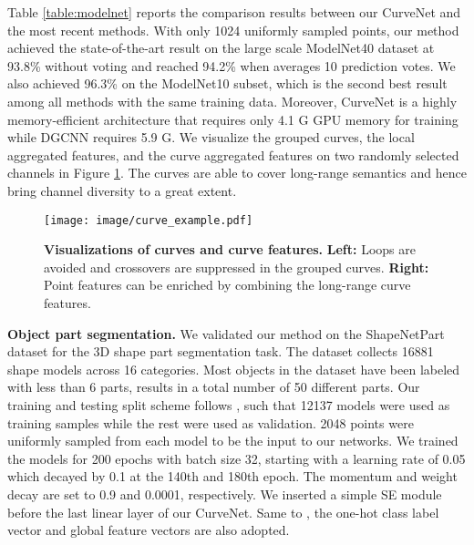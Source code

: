 \documentclass[10pt,twocolumn,letterpaper]{article}
\theoremstyle{definition}
\begin{document}
Table \ref{table:modelnet} reports the comparison results between our CurveNet and the most recent methods. With only 1024 uniformly sampled points, our method achieved the state-of-the-art result on the large scale ModelNet40 dataset at 93.8\% without voting \cite{liu2019relation} and reached 94.2\% when averages 10 prediction votes. We also achieved 96.3\% on the ModelNet10 subset, which is the second best result among all methods with the same training data. Moreover, CurveNet is a highly memory-efficient architecture that requires only 4.1 G GPU memory for training while DGCNN \cite{wang2019dynamic} requires 5.9 G. We visualize the grouped curves, the local aggregated features, and the curve aggregated features on two randomly selected channels in Figure \ref{fig:curves}. The curves are able to cover long-range semantics and hence bring channel diversity to a great extent. 






\begin{figure}[t]
	\begin{center}
\texttt{[image: image/curve\_example.pdf]}
	\end{center}
	\caption{\textbf{Visualizations of curves and curve features.} \textbf{Left:} Loops are avoided and crossovers are suppressed in the grouped curves. \textbf{Right:} Point features can be enriched by combining the long-range curve features.}
	\label{fig:curves}
\end{figure}
\noindent
\textbf{Object part segmentation.} We validated our method on the ShapeNetPart dataset \cite{yi2016scalable} for the 3D shape part segmentation task. The dataset collects 16881 shape models across 16 categories. Most objects in the dataset have been labeled with less than 6 parts, results in a total number of 50 different parts. Our training and testing split scheme follows \cite{qi2017pointnet, qi2017pointnet++}, such that 12137 models were used as training samples while the rest were used as validation. 2048 points were uniformly sampled from each model to be the input to our networks. We trained the models for 200 epochs with batch size 32, starting with a learning rate of 0.05 which decayed by 0.1 at the 140th and 180th epoch. The momentum and weight decay are set to 0.9 and 0.0001, respectively. We inserted a simple SE \cite{hu2018squeeze} module before the last linear layer of our CurveNet. Same to \cite{liu2019relation, bytyqi2020local}, the one-hot class label vector and global feature vectors are also adopted.
\end{document}
